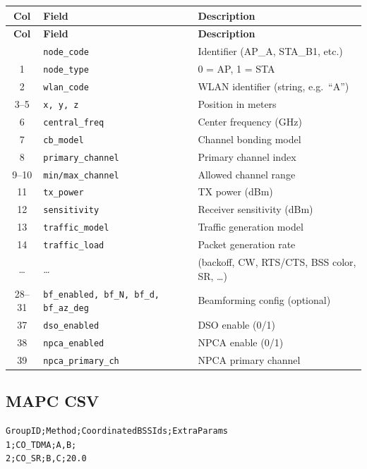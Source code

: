 \documentclass[11pt,a4paper]{article}
\begin{document}
\begin{longtable}{c l p{6cm}}
\toprule
\textbf{Col} & \textbf{Field} & \textbf{Description} \\
\midrule
\endfirsthead
\toprule
\textbf{Col} & \textbf{Field} & \textbf{Description} \\
\midrule
\endhead
\bottomrule
\endlastfoot
0  & \texttt{node\_code}             & Identifier (AP\_A, STA\_B1, etc.) \\
1  & \texttt{node\_type}             & 0 = AP, 1 = STA \\
2  & \texttt{wlan\_code}             & WLAN identifier (string, e.g.\ ``A'') \\
3--5  & \texttt{x, y, z}            & Position in meters \\
6  & \texttt{central\_freq}          & Center frequency (GHz) \\
7  & \texttt{cb\_model}              & Channel bonding model \\
8  & \texttt{primary\_channel}       & Primary channel index \\
9--10 & \texttt{min/max\_channel}    & Allowed channel range \\
11 & \texttt{tx\_power}              & TX power (dBm) \\
12 & \texttt{sensitivity}            & Receiver sensitivity (dBm) \\
13 & \texttt{traffic\_model}         & Traffic generation model \\
14 & \texttt{traffic\_load}          & Packet generation rate \\
\ldots & \ldots & (backoff, CW, RTS/CTS, BSS color, SR, \ldots) \\
28--31 & \texttt{bf\_enabled, bf\_N, bf\_d, bf\_az\_deg} & Beamforming config (optional) \\
37 & \texttt{dso\_enabled}           & DSO enable (0/1) \\
38 & \texttt{npca\_enabled}          & NPCA enable (0/1) \\
39 & \texttt{npca\_primary\_ch}      & NPCA primary channel \\
\end{longtable}

\subsection{MAPC CSV}

\begin{lstlisting}[language=CSV,caption={MAPC configuration format}]
GroupID;Method;CoordinatedBSSIds;ExtraParams
1;CO_TDMA;A,B;
2;CO_SR;B,C;20.0
\end{lstlisting}
\end{document}
